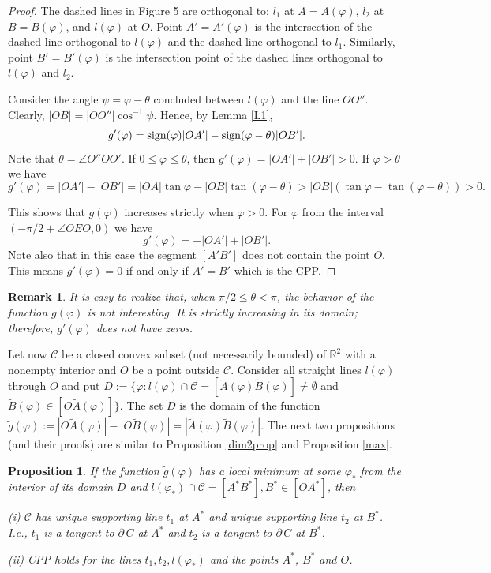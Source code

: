 \documentclass[a4paper,12pt]{amsart}
\newtheorem{prop}[thm]{Proposition}
\newtheorem{rem}[thm]{Remark}
\newcommand{\sign}{\text{\rm sign}}
\begin{document}
\begin{proof}
The dashed lines in Figure 5 are orthogonal to: $l_1$ at $A=A(\varphi)$, $l_2$ at $B=B(\varphi)$, and $l(\varphi)$ at $O$. Point $A'=A'(\varphi)$ is the intersection of the dashed line orthogonal to $l(\varphi)$ and the dashed line orthogonal to $l_1$. Similarly, point $B'= B'(\varphi)$ is the intersection point of the dashed lines orthogonal to $l(\varphi)$ and $l_2$.


Consider the angle $\psi = \varphi - \theta$ concluded between
$l(\varphi)$ and the line $OO''$. Clearly, $|OB|=
|OO''|\cos^{-1}\psi$. Hence, by Lemma \ref{L1},
$$g'(\varphi)= \sign(\varphi)|OA'| - \sign(\varphi - \theta)|OB'|.$$
Note that $\theta = \angle O''OO'$. If $0\leq \varphi \leq \theta$, then $g'(\varphi) =|OA'| + |OB'|> 0$. If $\varphi > \theta$ we have
$$g'(\varphi) =|OA'| - |OB'| = |OA|\tan \varphi - |OB|\tan(\varphi - \theta)>|OB|(\tan \varphi - \tan(\varphi - \theta)) >0.$$

This shows that $g(\varphi)$ increases strictly when $\varphi >0$. For $\varphi$ from the interval $(-\pi/2 + \angle OEO, 0)$ we have
$$g'(\varphi) = - |OA'| +|OB'|.$$
Note also that in this case the segment $[A'B']$ does not contain the point $O$. This means $g'(\varphi)=0$ if and only if $A'=B'$ which is the CPP.
\end{proof}

\begin{rem} \label{ostar}
{\rm
 It is easy to realize that, when $\pi/2 \leq \theta < \pi$, the behavior of the function $g(\varphi)$ is not interesting. It is strictly increasing in its domain; therefore, $g'(\varphi)$ does not have zeros. }
\end{rem}

Let now $\mathcal C$ be a closed convex subset (not necessarily bounded) of $\mathbb{R}^2$ with a
 nonempty interior and $O$ be a point outside  $\mathcal{C}$. Consider all
  straight lines $l(\varphi)$ through $O$ and put  $D :=\{\varphi: l(\varphi) \cap \mathcal C  = [\tilde{A}(\varphi)\tilde{B}(\varphi)] \not = \emptyset$ and $\tilde{B}(\varphi) \in [O\tilde{A}(\varphi)] \}$.
  The set $D$ is the domain of the function
 $\tilde{g}(\varphi):= |O \tilde{A}(\varphi)| - |O\tilde{B}(\varphi)| = |\tilde{A}(\varphi) \tilde{B}(\varphi)|.$
The next two propositions (and their proofs) are similar to Proposition \ref{dim2prop} and Proposition \ref{max}.

 \begin{prop} \label{tilde O outside}
 If the function $\tilde{g}(\varphi)$ has a local minimum at some $\varphi_*$ from
the interior of its domain $D$ and $l(\varphi_*) \cap \mathcal{C} = [A^*B^*], B^* \in [OA^*]$, then

(i) $\mathcal{C}$ has
unique supporting line $t_1$ at $A^*$ and unique supporting line $t_2$ at $ B^*$. I.e., $t_1$ is a tangent to $\partial\, C$ at $A^*$ and $t_2$ is a tangent to $\partial \, C$ at $B^*$.

(ii) CPP holds for the lines $t_1, t_2, l(\varphi_*)$  and the
points $A^*$, $B^*$ and $O$.
\end{prop}
\end{document}
